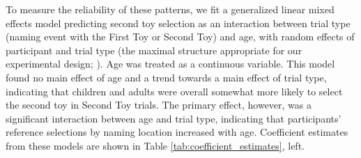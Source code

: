 \documentclass[man]{apa2}
\begin{document}
To measure the reliability of these patterns, we fit a generalized linear mixed effects model predicting second toy selection as an interaction between trial type (naming event with the First Toy or Second Toy) and age, with random effects of participant and trial type (the maximal structure appropriate for our experimental design; ). Age was treated as a continuous variable. This model found no main effect of age and a trend towards a main effect of trial type, indicating that children and adults were overall somewhat more likely to select the second toy in Second Toy trials. The primary effect, however, was a significant interaction between age and trial type, indicating that participants' reference selections by naming location increased with age. Coefficient estimates from these models are shown in Table \ref{tab:coefficient_estimates}, left.


\end{document}
